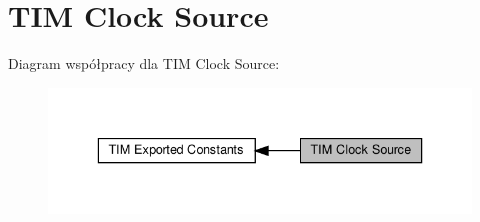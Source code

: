 \hypertarget{group___t_i_m___clock___source}{}\section{T\+IM Clock Source}
\label{group___t_i_m___clock___source}
Diagram współpracy dla T\+IM Clock Source\+:\nopagebreak
\begin{figure}[H]
\begin{center}
\leavevmode
\includegraphics[width=336pt]{group___t_i_m___clock___source}
\end{center}
\end{figure}

